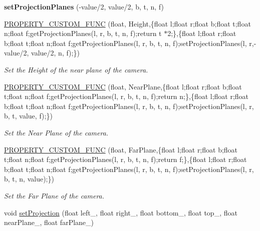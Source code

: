 \begin{DoxyCompactItemize}
\item 
{\bfseries set\+Projection\+Planes} (-\/value/2, value/2, b, t, n, f)\hypertarget{class_magnum_1_1_orthographic_camera_component_a3974cbac4f0c7a2922541c80fad25d43}{}\label{class_magnum_1_1_orthographic_camera_component_a3974cbac4f0c7a2922541c80fad25d43}

\item 
\hyperlink{class_magnum_1_1_orthographic_camera_component_a8189ecbd193694963ea6057690a79f99}{P\+R\+O\+P\+E\+R\+T\+Y\+\_\+\+C\+U\+S\+T\+O\+M\+\_\+\+F\+U\+NC} (float, Height,\{float l;float r;float b;float t;float n;float f;get\+Projection\+Planes(l, r, b, t, n, f);return t $\ast$2;\},\{float l;float r;float b;float t;float n;float f;get\+Projection\+Planes(l, r, b, t, n, f);set\+Projection\+Planes(l, r,-\/value/2, value/2, n, f);\})
\begin{DoxyCompactList}\small\item\em Set the Height of the near plane of the camera. \end{DoxyCompactList}\item 
\hyperlink{class_magnum_1_1_orthographic_camera_component_aec0cc2ceef20605ee89b1e589d5be66b}{P\+R\+O\+P\+E\+R\+T\+Y\+\_\+\+C\+U\+S\+T\+O\+M\+\_\+\+F\+U\+NC} (float, Near\+Plane,\{float l;float r;float b;float t;float n;float f;get\+Projection\+Planes(l, r, b, t, n, f);return n;\},\{float l;float r;float b;float t;float n;float f;get\+Projection\+Planes(l, r, b, t, n, f);set\+Projection\+Planes(l, r, b, t, value, f);\})
\begin{DoxyCompactList}\small\item\em Set the Near Plane of the camera. \end{DoxyCompactList}\item 
\hyperlink{class_magnum_1_1_orthographic_camera_component_aa22b4daa7e5874828648846c793e46db}{P\+R\+O\+P\+E\+R\+T\+Y\+\_\+\+C\+U\+S\+T\+O\+M\+\_\+\+F\+U\+NC} (float, Far\+Plane,\{float l;float r;float b;float t;float n;float f;get\+Projection\+Planes(l, r, b, t, n, f);return f;\},\{float l;float r;float b;float t;float n;float f;get\+Projection\+Planes(l, r, b, t, n, f);set\+Projection\+Planes(l, r, b, t, n, value);\})
\begin{DoxyCompactList}\small\item\em Set the Far Plane of the camera. \end{DoxyCompactList}\item 
void \hyperlink{class_magnum_1_1_orthographic_camera_component_a8e1270031c486ce7c92145b28c74c9fe}{set\+Projection} (float left\+\_\+, float right\+\_\+, float bottom\+\_\+, float top\+\_\+, float near\+Plane\+\_\+, float far\+Plane\+\_\+)

\end{DoxyCompactItemize}
